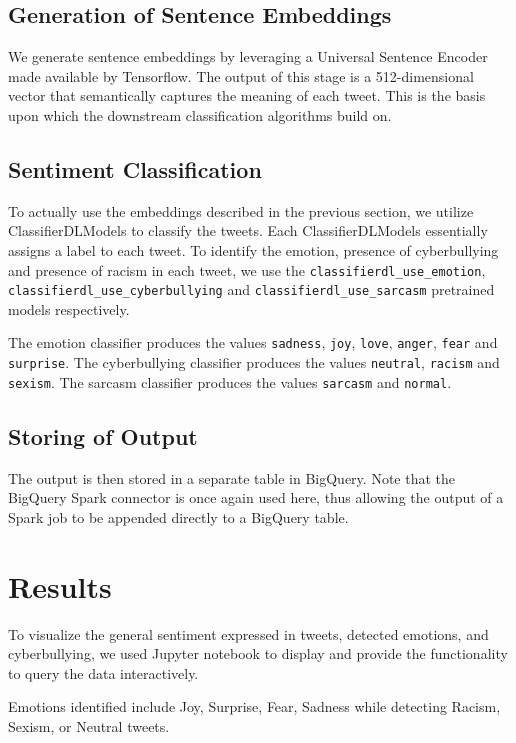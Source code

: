 \documentclass[a4paper,12pt]{article}
\begin{document}
\subsection{Generation of Sentence Embeddings}
\label{sec:sentence-embeddings}

We generate sentence embeddings by leveraging a Universal Sentence Encoder\cite{semanticSimilarity} made available by
Tensorflow. The output of this stage is a 512-dimensional vector that semantically captures the meaning of each tweet.
This is the basis upon which the downstream classification algorithms build on.

\subsection{Sentiment Classification}
To actually use the embeddings described in the previous section, we utilize ClassifierDLModels\cite{ClassifierDLModel}
to classify the tweets. Each ClassifierDLModels essentially assigns a label to each tweet. To identify the emotion,
presence of cyberbullying and presence of racism in each tweet, we use the \texttt{classifierdl\_use\_emotion},
\texttt{classifierdl\_use\_cyberbullying} and \texttt{classifierdl\_use\_sarcasm} pretrained models respectively.

The emotion classifier produces the values \texttt{sadness}, \texttt{joy}, \texttt{love}, \texttt{anger},
\texttt{fear} and \texttt{surprise}. The cyberbullying classifier produces the values \texttt{neutral},
\texttt{racism} and \texttt{sexism}. The sarcasm classifier produces the values \texttt{sarcasm} and \texttt{normal}.

\subsection{Storing of Output}
The output is then stored in a separate table in BigQuery. Note that the BigQuery Spark connector is once again used here, thus allowing the output of a Spark job to be appended directly to a BigQuery table.

\section{Results}
To visualize the general sentiment expressed in tweets, detected emotions, and cyberbullying, we used Jupyter notebook to
display and provide the functionality to query the data interactively.

Emotions identified include Joy, Surprise, Fear, Sadness while detecting Racism, Sexism, or Neutral tweets.
\end{document}
